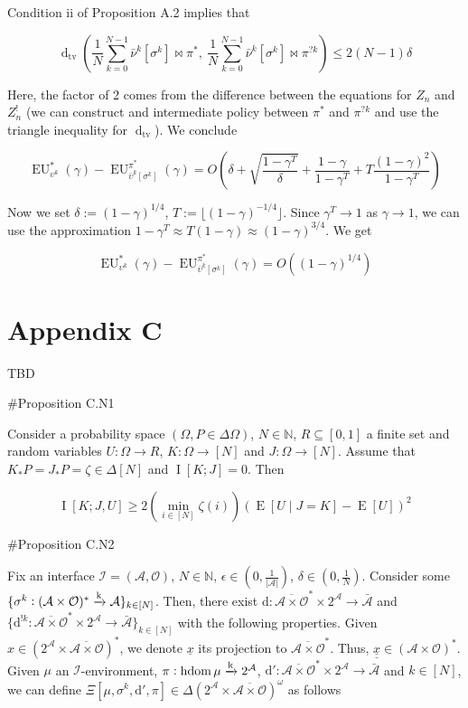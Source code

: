 \documentclass[a4paper]{article}
\newcommand{\E}[1]{\underset{#1}{\operatorname{E}}}
\newcommand{\I}[1]{\underset{#1}{\operatorname{I}}}
\newcommand{\D}{\mathrm{d}}
\newcommand{\Dtv}{\operatorname{d}_{\text{tv}}}
\newcommand{\Nats}{\mathbb{N}}
\newcommand{\Abs}[1]{\left\vert #1 \right\vert}
\newcommand{\Floor}[1]{\lfloor #1 \rfloor}
\newcommand{\M}{\xrightarrow{\textnormal{k}}}
\newcommand{\Ob}{\mathcal{O}}
\newcommand{\A}{\mathcal{A}}
\newcommand{\In}{\mathcal{I}}
\newcommand{\FH}{(\A \times \Ob)^*}
\newcommand{\Ada}{\bar{\A}}
\newcommand{\Adao}{\overline{\A \times \Ob}}
\newcommand{\Adfh}{\Adao^*}
\DeclareMathOperator{\HD}{hdom}
\newcommand{\EU}{\operatorname{EU}}
\newcommand{\J}{J}
\begin{document}
Condition ii of Proposition A.2 implies that

$$\Dtv\left(\frac{1}{N}\sum_{k=0}^{N-1}{\bar{\nu}^k\left[\sigma^k\right]\bowtie\pi^*},\ \frac{1}{N}\sum_{k=0}^{N-1}{\bar{\nu}^k\left[\sigma^k\right]\bowtie\pi^{?k}}\right) \leq 2(N-1)\delta$$

Here, the factor of 2 comes from the difference between the equations for $Z_n$ and $Z^!_n$ (we can construct and intermediate policy between $\pi^*$ and $\pi^{?k}$ and use the triangle inequality for $\Dtv$). We conclude

$$\EU^*_{\upsilon^k}(\gamma)-\EU^{\pi^{*}}_{\bar{\upsilon}^k[\sigma^k]}(\gamma) = O\left(\delta+\sqrt{\frac{1-\gamma^T}{\delta}} +\frac{1-\gamma}{1-\gamma^T}+T\frac{(1-\gamma)^2}{1-\gamma^T}\right)$$

Now we set $\delta:=\left(1-\gamma\right)^{1/4}$,  $T:=\Floor{\left(1-\gamma\right)^{-1/4}}$. Since $\gamma^T \rightarrow 1$ as $\gamma \rightarrow 1$, we can use the approximation $1-\gamma^T \approx T(1-\gamma) \approx (1-\gamma)^{3/4}$. We get

$$\EU^*_{\upsilon^k}(\gamma)-\EU^{\pi^{*}}_{\bar{\upsilon}^k[\sigma^k]}(\gamma) = O\left((1-\gamma)^{1/4}\right)$$

\section{Appendix C}

TBD

\#Proposition C.N1

Consider a probability space $(\Omega, P \in \Delta\Omega)$, $N \in \Nats$, $R \subseteq [0,1]$ a finite set and random variables $U: \Omega \rightarrow R$, $K: \Omega \rightarrow [N]$ and $\J: \Omega \rightarrow [N]$. Assume that $K_*P = J_*P = \zeta \in \Delta[N]$ and $\I{}[K;J] = 0$. Then

$$\I{}\left[K;J,U\right] \geq 2 \left(\min_{i \in [N]} {\zeta(i)}\right) \left(\E{}\left[U \mid J = K\right]-\E{}\left[U\right]\right)^2$$

\#Proposition C.N2

Fix an interface $\In=(\A,\Ob)$, $N \in \Nats$, $\epsilon \in (0,\frac{1}{\Abs{\A}})$, $\delta \in (0,\frac{1}{N})$. Consider some $\{\sigma^k: \FH \M \A\}_{k \in [N]}$. Then, there exist $\D: \Adfh \times 2^\A \rightarrow \Ada$ and $\{\D^{!k}: \Adfh \times 2^\A \rightarrow \Ada\}_{k \in [N]}$ with the following properties. Given $x \in \left(2^\A \times \Adao\right)^*$, we denote $\underline{x}$ its projection to $\Adfh$. Thus, $\underline{\underline{x}}\in\FH$.
Given  $\mu$ an $\In$-environment, $\pi: \HD{\mu} \M 2^\A$, $\D': \Adfh \times 2^\A \rightarrow \Ada$ and $k \in [N]$, we can define $\Xi\left[\mu,\sigma^k,\D',\pi\right]\in \Delta\left(2^\A \times \Adao\right)^\omega$ as follows
 
\end{document}
